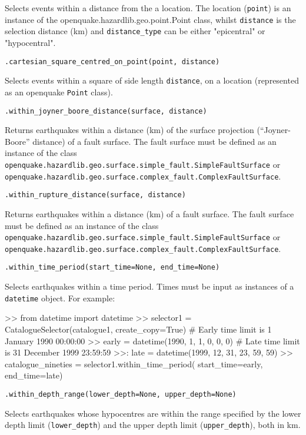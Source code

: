 Selects events within a distance from the a location. The location (\verb=point=) is an instance of the openquake.hazardlib.geo.point.Point class, whilst \verb=distance= is the selection distance (km) and \verb=distance_type= can be either "epicentral" or "hypocentral".  

\verb;.cartesian_square_centred_on_point(point, distance);

Selects events within a square of side length \verb=distance=, on a location (represented as an openquake \verb=Point= class).

\verb;.within_joyner_boore_distance(surface, distance);

Returns earthquakes within a distance (km) of the surface projection (``Joyner-Boore'' distance) of a fault surface. The fault surface must be defined as an instance of the class \\\verb=openquake.hazardlib.geo.surface.simple_fault.SimpleFaultSurface= or\\ \verb=openquake.hazardlib.geo.surface.complex_fault.ComplexFaultSurface=.

\verb;.within_rupture_distance(surface, distance);

Returns earthquakes within a distance (km) of a fault surface. The fault surface must be defined as an instance of the class \\\verb=openquake.hazardlib.geo.surface.simple_fault.SimpleFaultSurface= or\\ \verb=openquake.hazardlib.geo.surface.complex_fault.ComplexFaultSurface=.

\verb;.within_time_period(start_time=None, end_time=None);

Selects earthquakes within a time period. Times must be input as instances of a \verb=datetime= object. For example:

\begin{python}[frame=single]
>> from datetime import datetime
>> selector1 = CatalogueSelector(catalogue1, create_copy=True)
# Early time limit is 1 January 1990 00:00:00
>> early = datetime(1990, 1, 1, 0, 0, 0)
# Late time limit is 31 December 1999 23:59:59
>>: late = datetime(1999, 12, 31, 23, 59, 59)
>> catalogue_nineties = selector1.within_time_period(
    start_time=early,
    end_time=late)
\end{python}

\verb;.within_depth_range(lower_depth=None, upper_depth=None);

Selects earthquakes whose hypocentres are within the range specified by the lower depth limit (\verb=lower_depth=) and the upper depth limit (\verb=upper_depth=), both in km.

